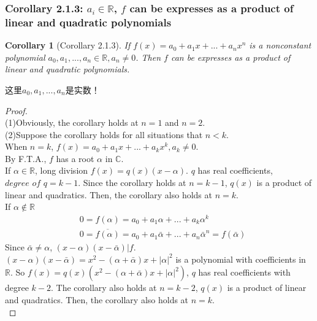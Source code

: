 \documentclass[11pt,a4paper]{article}
\newtheorem{corollary}{Corollary}
\begin{document}
\subsubsection{Corollary 2.1.3: $a_i\in \mathbb{R}$, $f$ can be expresses as a product of linear and quadratic polynomials}
\begin{corollary}[Corollary 2.1.3]
    If $f (x) = a_0 + a_1x + ... + a_nx^n$ is a nonconstant
    polynomial $a_0, a_1, ..., a_n \in \mathbb{R}, a_n \neq 0$.
    Then $f$ can be expresses as a product of linear and quadratic polynomials.
\end{corollary}
这里$a_0, a_1, ..., a_n$是实数！
\begin{proof}
\quad\\
(1)Obviously, the corollary holds at $n=1$ and $n=2$.\\
(2)Suppose the corollary holds for all situations that $n<k$.\\
When $n=k$, $f (x) = a_0 + a_1x + ... + a_kx^k, a_k\neq 0$.\\
By F.T.A., $f$ has a root $\alpha$ in $\mathbb{C}$.\\
If $\alpha\in\mathbb{R}$, long division $f(x)=q(x)(x-\alpha)$. $q$ has real coefficients, $\textit{degree of }q=k-1$. Since the corollary holds at $n=k-1$, $q(x)$ is a product of linear and quadratics. Then, the corollary also holds at $n=k$.\\
If $\alpha\notin\mathbb{R}$
\begin{equation}
    \begin{aligned}
        &0=f(\alpha)=a_0+a_1\alpha+...+a_k\alpha^k\\
        &0=\overline{f(\alpha)}={a_0}+{a_1}\bar{\alpha}+...+{a_n}\bar{\alpha}^n=f(\bar{\alpha})
    \end{aligned}
    \nonumber
\end{equation}
Since $\bar{\alpha}\neq\alpha$, $(x-\alpha)(x-\bar{\alpha})|f$.\\
$(x-\alpha)(x-\bar{\alpha})=x^2-(\alpha+\bar{\alpha})x+|\alpha|^2$ is a polynomial with coefficients in $\mathbb{R}$. So $f(x)=q(x)(x^2-(\alpha+\bar{\alpha})x+|\alpha|^2)$, $q$ has real coefficients with degree $k-2$. The corollary also holds at $n=k-2$, $q(x)$ is a product of linear and quadratics. Then, the corollary also holds at $n=k$.\\
\end{proof}
\end{document}
